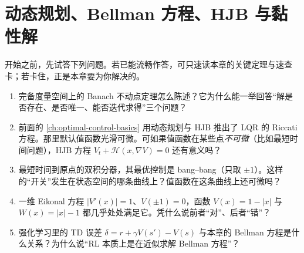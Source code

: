 \chapter{动态规划、Bellman 方程、HJB 与黏性解}
\label{ch:dp-hjb}


\begin{practice}[前置自测]
开始之前，先试答下列问题。若已能流畅作答，可只速读本章的关键定理与速查卡；若卡住，正是本章要为你解决的。
\begin{enumerate}
  \item 完备度量空间上的 Banach 不动点定理怎么陈述？它为什么能一举回答“解是否存在、是否唯一、能否迭代求得”三个问题？
  \item 前面的 \cref{ch:optimal-control-basics} 用动态规划与 HJB 推出了 LQR 的 Riccati 方程。那里默认值函数光滑可微。可如果值函数在某些点\emph{不可微}（比如最短时间问题），HJB 方程 $V_t+\mathcal H(x,\nabla V)=0$ 还有意义吗？
  \item 最短时间到原点的双积分器，其最优控制是 bang--bang（只取 $\pm1$）。这样的“开关”发生在状态空间的哪条曲线上？值函数在这条曲线上还可微吗？
  \item 一维 Eikonal 方程 $|V'(x)|=1$、$V(\pm1)=0$，函数 $V(x)=1-|x|$ 与 $W(x)=|x|-1$ 都几乎处处满足它。凭什么说前者“对”、后者“错”？
  \item 强化学习里的 TD 误差 $\delta=r+\gamma V(s')-V(s)$ 与本章的 Bellman 方程是什么关系？为什么说“RL 本质上是在近似求解 Bellman 方程”？
\end{enumerate}
\end{practice}

